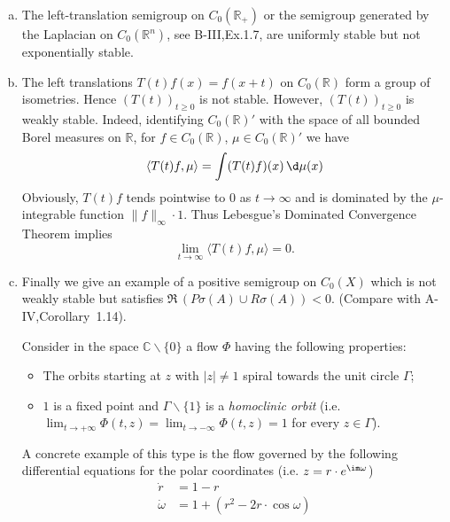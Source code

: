 \begin{example}\label{ex:b4-1.2}
\begin{enumerate}[(a), wide, labelsep=1em, itemindent=\parindent]
\item
The left-translation semigroup on $C_{0}(\mathbb{R}_+)$ or the semigroup generated by the Laplacian on $C_{0}(\mathbb{R}^n)$, see B-III,Ex.1.7, are uniformly stable but not exponentially stable.

\item 
The left translations $T(t)f(x) = f(x+t)$ on $C_{0}(\mathbb{R})$ form a group of isometries. Hence $(T(t))_{t \geq 0}$ is not stable. However, $(T(t))_{t \geq 0}$ is weakly stable. Indeed, identifying $C_{0}(\mathbb{R})'$ with the space of all bounded Borel measures on $\mathbb{R}$, for $f \in C_{0}(\mathbb{R})$, $\mu \in C_{0}(\mathbb{R})'$ we have
\[
   \langle T(t)f,\mu \rangle = \int (T(t)f)(x) \, \d\mu(x)
\]
Obviously, $T(t)f$ tends pointwise to $0$ as $t \to \infty$ and is dominated by the $\mu$-integrable function $\|f\|_\infty \cdot 1$. Thus Lebesgue's Dominated Convergence Theorem implies
\[ 
\lim_{t\to\infty} \langle T(t)f,\mu \rangle = 0.
\]

\item 
Finally we give an example of a positive semigroup on $C_{0}(X)$ which is not weakly stable but satisfies $\Re\,(P\sigma(A) \cup R\sigma(A)) < 0$. (Compare with A-IV,Corollary~1.14).

Consider in the space $\mathbb{C}\backslash\{0\}$ a flow $\Phi$ having the following properties:
\begin{itemize}[-]
	\item 
	The orbits starting at $z$ with $|z| \neq 1$ spiral towards the unit circle $\Gamma$;
	
	\item 
	$1$ is a fixed point and $\Gamma\backslash\{1\}$ is a \emph{homoclinic orbit} (i.e. $\lim_{t\to+\infty} \Phi(t,z) = \lim_{t\to-\infty} \Phi(t,z) = 1$ for every $z \in \Gamma$).
\end{itemize}

A concrete example of this type is the flow governed by the following differential equations for the polar coordinates (i.e. $z = r\cdot e^{\im\omega}$)
\[
   \begin{aligned}
   \dot{r} &= 1 - r\\
   \dot{\omega} &= 1 + (r^2 - 2r\cdot\cos \omega)
   \end{aligned}
\]


\end{enumerate}
\end{example}
